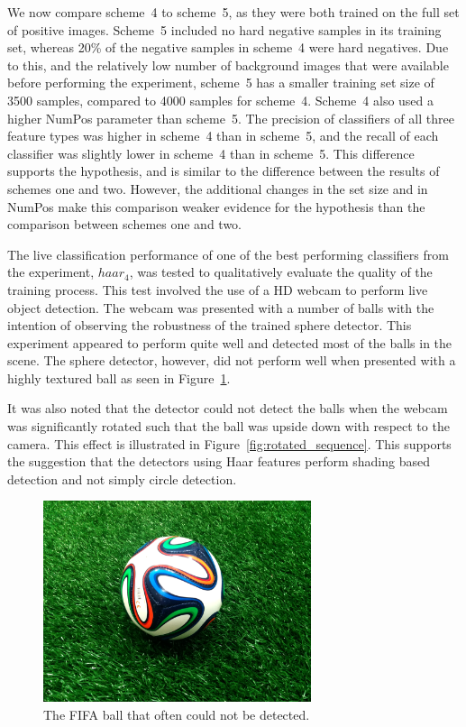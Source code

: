 \documentclass{llncs}
\begin{document}
{		We now compare scheme~4 to scheme~5, as they were both trained on the full set of positive images. Scheme~5 included no hard negative samples in its training set, whereas 20\% of the negative samples in scheme~4 were hard negatives. Due to this, and the relatively low number of background images that were available before performing the experiment, scheme~5 has a smaller training set size of 3500 samples, compared to 4000 samples for scheme~4. Scheme~4 also used a higher NumPos parameter than scheme~5.
		The precision of classifiers of all three feature types was higher in scheme~4 than in scheme~5, and the recall of each classifier was slightly lower in scheme~4 than in scheme~5.
		This difference supports the hypothesis, and is similar to the difference between the results of schemes one and two. However, the additional changes in the set size and in NumPos make this comparison weaker evidence for the hypothesis than the comparison between schemes one and two.

		The live classification performance of one of the best performing classifiers from the experiment, \(haar_4\), was tested to qualitatively evaluate the quality of the training process.
		This test involved the use of a HD webcam to perform live object detection. The webcam was presented with a number of balls with the intention of observing the robustness of the trained sphere detector.
		This experiment appeared to perform quite well and detected most of the balls in the scene. The sphere detector, however, did not perform well when presented with a highly textured ball as seen in Figure~\ref{fig:fifa_ball}.

		It was also noted that the detector could not detect the balls when the webcam was significantly rotated such that the ball was upside down with respect to the camera. This effect is illustrated in Figure~\ref{fig:rotated_sequence}. This supports the suggestion that the detectors using Haar features perform shading based detection and not simply circle detection.

		\begin{figure}
			\centering
			\includegraphics[width=0.7\textwidth]{images/fifa_ball}
			\caption{The FIFA ball that often could not be detected.}
			\label{fig:fifa_ball}
		\end{figure}
		\newpage

}
\end{document}
